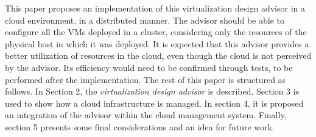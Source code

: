 This paper proposes an implementation of this virtualization design advisor in a cloud environment, in a distributed manner. The advisor should be able to configure all the VMs deployed in a cluster, considering only the resources of the physical host in which it was deployed. It is expected that this advisor provides a better utilization of resources in the cloud, even though the cloud is not perceived by the advisor. Its efficiency would need to be confirmed through tests, to be performed after the implementation. The rest of this paper is structured as follows. In Section 2, the \textit{virtualization design advisor} is described. Section 3 is used to show how a cloud infrastructure is managed. In section 4, it is proposed an integration of the advisor within the cloud management system. Finally, section 5 presents some final considerations and an idea for future work.

